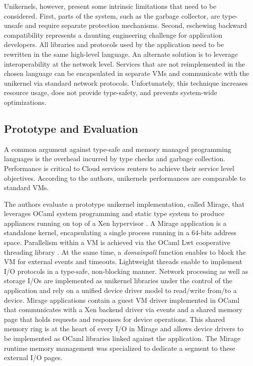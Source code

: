 Unikernels, however, present some intrinsic limitations that need to be considered.
First, parts of the system, such as the garbage collector, are type-unsafe and require separate protection mechanisms.
Second, eschewing backward compatibility represents a daunting engineering challenge for application developers.
All libraries and protocols used by the application need to be rewritten in the same high-level language.
An alternate solution is to leverage interoperability at the network level.
Services that are not reimplemented in the chosen language can be encapsulated in separate VMs and communicate with the unikernel via standard network protocols.
Unfortunately, this technique increases resource usage, does not provide type-safety, and prevents system-wide optimizations.


\subsection{Prototype and Evaluation}

A common argument against type-safe and memory managed programming languages is the overhead incurred by type checks and garbage collection.
Performance is critical to Cloud services renters to achieve their service level objectives.
According to the authors, unikernels performances are comparable to standard VMs.

The authors evaluate a prototype unikernel implementation, called Mirage, that leverages OCaml system programming and static type system to produce appliances running on top of a Xen hypervisor \cite{DBLP:conf/sosp/BarhamDFHHHN03}.
A Mirage application is a standalone kernel, encapsulating a single process running in a 64-bits address space.
Parallelism within a VM is achieved via the OCaml Lwt cooperative threading library \cite{DBLP:conf/ml/Vouillon08}.
At the same time, a \emph{domainpoll} function enables to block the VM for external events and timeouts.
Lightweight threads enable to implement I/O protocols in a type-safe, non-blocking manner.
Network processing as well as storage I/Os are implemented as unikernel libraries under the control of the application and rely on a unified device driver model to read/write from/to a device.
Mirage applications contain a guest VM driver implemented in OCaml that communicates with a Xen backend driver via events and a shared memory page that holds requests and responses for device operations.
This shared memory ring is at the heart of every I/O in Mirage and allows device drivers to be implemented as OCaml libraries linked against the application.
The Mirage runtime memory management was specialized to dedicate a segment to these external I/O pages.

